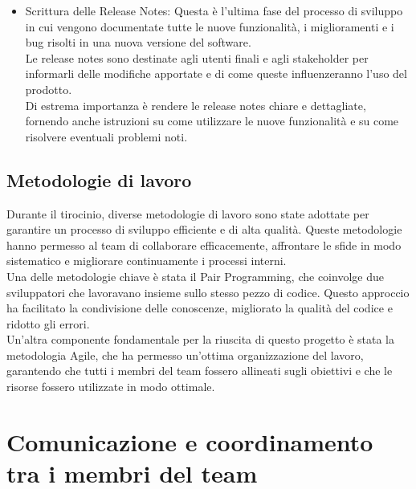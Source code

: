\begin{itemize}
  \item Scrittura delle Release Notes: Questa è l'ultima fase del processo di
    sviluppo in cui vengono documentate tutte le nuove funzionalità, i miglioramenti
    e i bug risolti in una nuova versione del software.\\ Le release notes sono destinate
    agli utenti finali e agli stakeholder per informarli delle modifiche apportate
    e di come queste influenzeranno l'uso del prodotto.\\ Di estrema importanza è
    rendere le release notes chiare e dettagliate, fornendo anche istruzioni su
    come utilizzare le nuove funzionalità e su come risolvere eventuali problemi
    noti.
\end{itemize}

\subsection{Metodologie di lavoro}
\label{sub:metodologie_lavoro}

Durante il tirocinio, diverse metodologie di lavoro sono state adottate per garantire
un processo di sviluppo efficiente e di alta qualità. Queste metodologie hanno
permesso al team di collaborare efficacemente, affrontare le sfide in modo sistematico
e migliorare continuamente i processi interni.\\ Una delle metodologie chiave è stata
il Pair Programming, che coinvolge due sviluppatori che lavoravano insieme sullo
stesso pezzo di codice. Questo approccio ha facilitato la condivisione delle conoscenze,
migliorato la qualità del codice e ridotto gli errori.\\ Un'altra componente
fondamentale per la riuscita di questo progetto è stata la metodologia Agile, che
ha permesso un'ottima organizzazione del lavoro, garantendo che tutti i membri
del team fossero allineati sugli obiettivi e che le risorse fossero utilizzate
in modo ottimale.

\section{Comunicazione e coordinamento tra i membri del team}
\label{sec:coordinamento}

